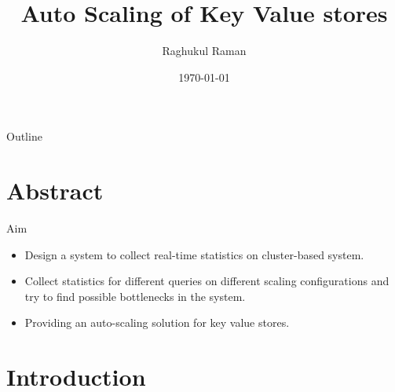 \documentclass{beamer}
\title[CS396]{Auto Scaling of Key Value stores}
\author{Raghukul Raman}
\institute{IIT Kanpur}
\date{\today}
\begin{document}
\begin{frame}
  \titlepage
\end{frame}

\begin{frame}{Outline}
  \tableofcontents
\end{frame}

\section{Abstract}

\begin{frame}{Aim}
    \begin{itemize}
        \pause\item Design a system to collect real-time statistics on cluster-based system.
        \pause\item Collect statistics for different queries on different scaling configurations
            and try to find possible bottlenecks in the system.
        \pause\item Providing an auto-scaling solution for key
                value stores. 
    \end{itemize}
\end{frame}

\section{Introduction}
\end{document}

